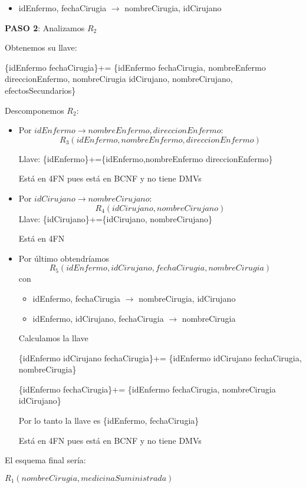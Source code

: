 \begin{itemize}
\begin{itemize}
\begin{itemize}[label=\textcolor{magenta}{$\bigstar$}]
\begin{itemize}
            \item idEnfermo, fechaCirugia $\rightarrow$ nombreCirugia, idCirujano
        \end{itemize}
    \end{itemize}
\end{itemize}


\textbf{PASO 2}: Analizamos $R_2$

Obtenemos su llave:

\{idEnfermo fechaCirugia\}+= \{idEnfermo  fechaCirugia, nombreEnfermo  direccionEnfermo, nombreCirugia idCirujano,
nombreCirujano, efectosSecundarios\} 

Descomponemos $R_2$:
\begin{itemize}[label=\textcolor{blue}{$\clubsuit$}]
    \item Por $idEnfermo \rightarrow nombreEnfermo, direccionEnfermo$:
    \[
    R_3(idEnfermo, nombreEnfermo, direccionEnfermo)
    \]

    Llave: \{idEnfermo\}+=\{idEnfermo,nombreEnfermo  direccionEnfermo\} 

    Está en 4FN pues está en BCNF y no tiene DMVs
    \item Por $idCirujano \rightarrow nombreCirujano$:
    \[
    R_4(idCirujano, nombreCirujano)
    \]
    Llave: \{idCirujano\}+=\{idCirujano, nombreCirujano\}

    Está en 4FN 
    \item Por último obtendríamos
\[R_5(idEnfermo, idCirujano, fechaCirugia, nombreCirugia)\]
con
\begin{itemize}
    \item idEnfermo, fechaCirugia $\rightarrow$ nombreCirugia, idCirujano
    \item idEnfermo, idCirujano, fechaCirugia $\rightarrow$ nombreCirugia

\end{itemize}
Calculamos la llave 

\{idEnfermo idCirujano fechaCirugia\}+=
\{idEnfermo idCirujano fechaCirugia, nombreCirugia\}

\{idEnfermo fechaCirugia\}+=
\{idEnfermo fechaCirugia, nombreCirugia idCirujano\}

Por lo tanto la llave es \{idEnfermo, fechaCirugia\}

Está en 4FN pues está en BCNF y no tiene DMVs

\end{itemize}

El esquema final sería:
\begin{center}
    $R_1(nombreCirugia, medicinaSuministrada)$
    

\end{center}
\end{itemize}
